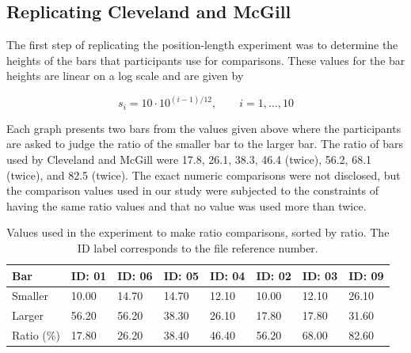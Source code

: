 \documentclass[letterpaper,inpress,dvipsnames]{jdsart}
\begin{document}
\hypertarget{replicating-cleveland-and-mcgill}{%
\subsection{Replicating Cleveland and McGill}\label{replicating-cleveland-and-mcgill}}

The first step of replicating the position-length experiment was to determine the heights of the bars that participants use for comparisons.
These values for the bar heights are linear on a log scale and are given by

\[s_i=10\cdot 10^{(i-1)/12}, \qquad i=1,...,10\]

Each graph presents two bars from the values given above where the participants are asked to judge the ratio of the smaller bar to the larger bar. The ratio of bars used by Cleveland and McGill were 17.8, 26.1, 38.3, 46.4 (twice), 56.2, 68.1 (twice), and 82.5 (twice).
The exact numeric comparisons were not disclosed, but the comparison values used in our study were subjected to the constraints of having the same ratio values and that no value was used more than twice.

\begin{table}[tbp]

\begin{center}
\begin{threeparttable}

\caption{\label{tab:experiment-values}Values used in the experiment to make ratio comparisons, sorted by ratio. The ID label corresponds to the file reference number.}

\begin{tabular}{llllllll}
\toprule
Bar & \multicolumn{1}{c}{ID: 01} & \multicolumn{1}{c}{ID: 06} & \multicolumn{1}{c}{ID: 05} & \multicolumn{1}{c}{ID: 04} & \multicolumn{1}{c}{ID: 02} & \multicolumn{1}{c}{ID: 03} & \multicolumn{1}{c}{ID: 09}\\
\midrule
Smaller & 10.00 & 14.70 & 14.70 & 12.10 & 10.00 & 12.10 & 26.10\\
Larger & 56.20 & 56.20 & 38.30 & 26.10 & 17.80 & 17.80 & 31.60\\
Ratio (\%) & 17.80 & 26.20 & 38.40 & 46.40 & 56.20 & 68.00 & 82.60\\
\bottomrule
\end{tabular}

\end{threeparttable}
\end{center}

\end{table}
\end{document}
